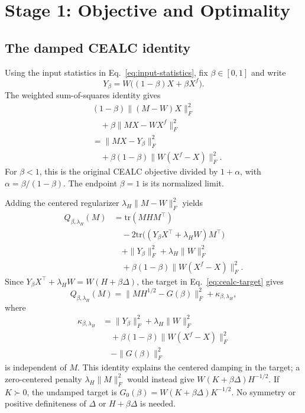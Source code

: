 \section{Stage 1: Objective and Optimality}\label{sup:thm1}

\subsection{The damped CEALC identity}\label{sup:cealc-identity}

Using the input statistics in Eq.~\eqref{eq:input-statistics}, fix $\beta\in[0,1]$ and write
\begin{equation}
Y_\beta=W\big((1-\beta)X+\beta X^f\big).
\end{equation}
The weighted sum-of-squares identity gives
\begin{equation}
\begin{aligned}
&(1-\beta)\|(M-W)X\|_F^2\\
&\quad+\beta\|MX-WX^f\|_F^2 \\
&=\|MX-Y_\beta\|_F^2\\
&\quad+\beta(1-\beta)\|W(X^f-X)\|_F^2.
\end{aligned}
\end{equation}
For $\beta<1$, this is the original CEALC objective divided by $1+\alpha$, with $\alpha=\beta/(1-\beta)$. The endpoint $\beta=1$ is its normalized limit.

Adding the centered regularizer $\lambda_H\|M-W\|_F^2$ yields
\begin{equation}
\begin{aligned}
Q_{\beta,\lambda_H}(M)
&=\mathrm{tr}(MHM^\top) \\
&\quad-2\mathrm{tr}\big((Y_\beta X^\top+\lambda_H W)M^\top\big) \\
&\quad+\|Y_\beta\|_F^2+\lambda_H\|W\|_F^2 \\
&\quad+\beta(1-\beta)\|W(X^f-X)\|_F^2.
\end{aligned}
\end{equation}
Since $Y_\beta X^\top+\lambda_H W=W(H+\beta\Delta)$, the target in Eq.~\eqref{eq:cealc-target} gives
\begin{equation}
Q_{\beta,\lambda_H}(M)
=\|MH^{1/2}-G(\beta)\|_F^2+\kappa_{\beta,\lambda_H},
\end{equation}
where
\begin{equation}
\begin{aligned}
\kappa_{\beta,\lambda_H}
&=\|Y_\beta\|_F^2+\lambda_H\|W\|_F^2 \\
&\quad+\beta(1-\beta)\|W(X^f-X)\|_F^2\\
&\quad-\|G(\beta)\|_F^2
\end{aligned}
\end{equation}
is independent of $M$. This identity explains the centered damping in the target; a zero-centered penalty $\lambda_H\|M\|_F^2$ would instead give $W(K+\beta\Delta)H^{-1/2}$. If $K\succ0$, the undamped target is $G_0(\beta)=W(K+\beta\Delta)K^{-1/2}$. No symmetry or positive definiteness of $\Delta$ or $H+\beta\Delta$ is needed.

